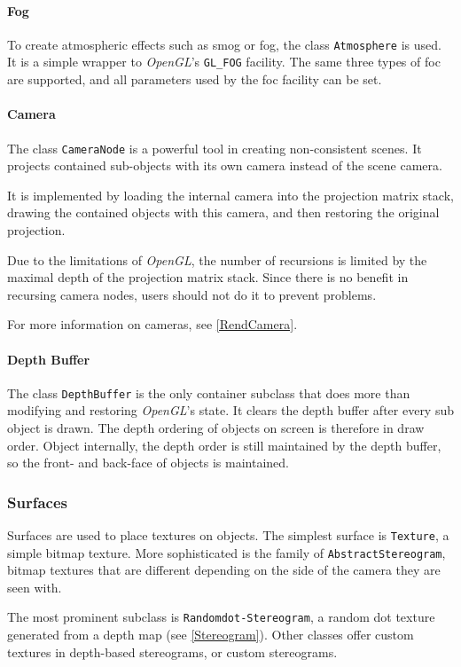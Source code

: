 \paragraph{Fog}
To create atmospheric effects such as smog or fog, the class \lstinline{Atmosphere} is used.
It is a simple wrapper to \textit{OpenGL}'s \lstinline{GL_FOG} facility.
The same three types of foc are supported, and all parameters used by the foc facility can be set.

\paragraph{Camera}
The class \lstinline{CameraNode} is a powerful tool in creating non-consistent scenes.
It projects contained sub-objects with its own camera instead of the scene camera.

It is implemented by loading the internal camera into the projection matrix stack, drawing the contained objects with this camera, and then restoring the original projection.

Due to the limitations of \textit{OpenGL}, the number of recursions is limited by the maximal depth of the projection matrix stack.
Since there is no benefit in recursing camera nodes, users should not do it to prevent problems.

For more information on cameras, see \ref{RendCamera}.

\paragraph{Depth Buffer}
The class \lstinline{DepthBuffer} is the only container subclass that does more than modifying and restoring \textit{OpenGL}'s state.
It clears the depth buffer after every sub object is drawn.
The depth ordering of objects on screen is therefore in draw order.
Object internally, the depth order is still maintained by the depth buffer, so the front- and back-face of objects is maintained.


\subsubsection{Surfaces}
Surfaces are used to place textures on objects.
The simplest surface is \lstinline{Texture}, a simple bitmap texture.
More sophisticated is the family of \lstinline{AbstractStereogram}, bitmap textures that are different depending on the side of the camera they are seen with.

The most prominent subclass is \lstinline{Randomdot-Stereogram}, a random dot texture generated from a depth map (see \ref{Stereogram}).
Other classes offer custom textures in depth-based stereograms, or custom stereograms.

